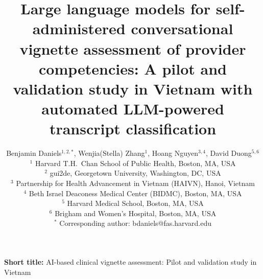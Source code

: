 \documentclass{article}
\begin{document}

\title{Large language models for self-administered conversational vignette assessment of provider competencies: A pilot and validation study in Vietnam with automated LLM-powered transcript classification}

\author{
  Benjamin Daniels$^{1,2,\ast}$,
  Wenjia(Stella) Zhang$^{1}$,
  Hoang Nguyen$^{3,4}$,
  David Duong$^{5,6}$ \\[6pt]
  \small $^{1}$ Harvard T.H.\ Chan School of Public Health, Boston, MA, USA \\
  \small $^{2}$ gui2de, Georgetown University, Washington, DC, USA \\
  \small $^{3}$ Partnership for Health Advancement in Vietnam (HAIVN), Hanoi, Vietnam \\
  \small $^{4}$ Beth Israel Deaconess Medical Center (BIDMC), Boston, MA, USA \\
  \small $^{5}$ Harvard Medical School, Boston, MA, USA \\
  \small $^{6}$ Brigham and Women's Hospital, Boston, MA, USA \\[4pt]
  \small $^{\ast}$ Corresponding author: bdaniels@fas.harvard.edu
}

\date{}
\maketitle
\thispagestyle{empty}

\noindent \textbf{Short title:} AI-based clinical vignette assessment: Pilot and validation study in Vietnam

\newpage

\end{document}
